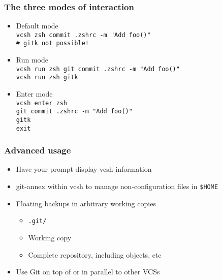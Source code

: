 \documentclass[t]{beamer}
\begin{document}
\begin{frame}
	\frametitle{The three modes of interaction}
	\begin{itemize}
		\item Default mode \\
			\texttt{vcsh zsh commit .zshrc -m "Add foo()" \\
				\# gitk not possible!
		}
		\item Run mode \\
			\texttt{vcsh run zsh git commit .zshrc -m "Add foo()" \\
				vcsh run zsh gitk
			}
		\item Enter mode \\
			\texttt{vcsh enter zsh \\
				git commit .zshrc -m "Add foo()" \\
				gitk \\
				exit
			}
	\end{itemize}
\end{frame}

\begin{frame}
	\frametitle{Advanced usage}
	\begin{itemize}
		\item Have your prompt display vcsh information
		\item git-annex within vcsh to manage non-configuration files in \texttt{\$HOME}
		\item Floating backups in arbitrary working copies
		\begin{itemize}
			\item \texttt{.git/}
			\item Working copy
			\item Complete repository, including objects, etc
		\end{itemize}
		\item Use Git on top of or in parallel to other VCSs
	\end{itemize}
\end{frame}
\end{document}
